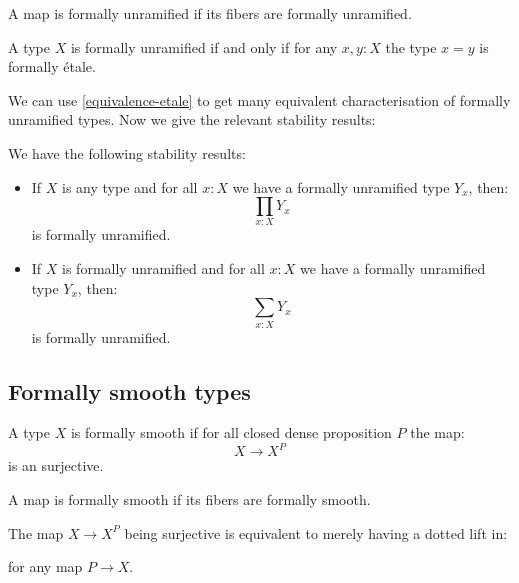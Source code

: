 \begin{definition}
A map is formally unramified if its fibers are formally unramified.
\end{definition}

\begin{remark}
A type $X$ is formally unramified if and only if for any $x,y:X$ the type $x=y$ is formally étale.
\end{remark}

We can use \cref{equivalence-etale} to get many equivalent characterisation of formally unramified types. Now we give the relevant stability results:

\begin{proposition}
We have the following stability results:
\begin{itemize}
\item If $X$ is any type and for all $x:X$ we have a formally unramified type $Y_x$, then:
\[\prod_{x:X}Y_x\]
is formally unramified. 
\item  If $X$ is formally unramified and for all $x:X$ we have a formally unramified type $Y_x$, then:
\[\sum_{x:X}Y_x\]
is formally unramified.
\end{itemize}
\end{proposition}


\subsection{Formally smooth types}

\begin{definition}
A type $X$ is formally smooth if for all closed dense proposition $P$ the map:
\[X\to X^P\]
is an surjective.
\end{definition}

\begin{definition}
A map is formally smooth if its fibers are formally smooth.
\end{definition}

\begin{remark}
The map $X\to X^P$ being surjective is equivalent to merely having a dotted lift in:
\begin{center}
\end{center}
for any map $P\to X$.
\end{remark}

